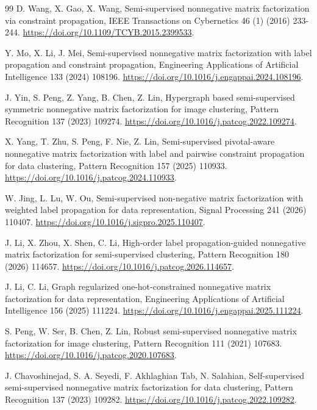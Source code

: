 \documentclass[preprint,12pt]{elsarticle}
\theoremstyle{remark}
\begin{document}
\begin{thebibliography}{99}
D. Wang, X. Gao, X. Wang, Semi-supervised nonnegative matrix factorization via constraint propagation,
IEEE Transactions on Cybernetics 46 (1) (2016) 233-244.
\url{https://doi.org/10.1109/TCYB.2015.2399533}.

Y. Mo, X. Li, J. Mei, Semi-supervised nonnegative matrix factorization with label propagation and constraint propagation,
Engineering Applications of Artificial Intelligence 133 (2024) 108196.
\url{https://doi.org/10.1016/j.engappai.2024.108196}.

J. Yin, S. Peng, Z. Yang, B. Chen, Z. Lin, Hypergraph based semi-supervised symmetric nonnegative matrix factorization for image clustering,
Pattern Recognition 137 (2023) 109274. \url{https://doi.org/10.1016/j.patcog.2022.109274}.

X. Yang, T. Zhu, S. Peng, F. Nie, Z. Lin, Semi-supervised pivotal-aware nonnegative matrix factorization with label and pairwise constraint propagation for data clustering,
Pattern Recognition 157 (2025) 110933. \url{https://doi.org/10.1016/j.patcog.2024.110933}.

W. Jing, L. Lu, W. Ou, Semi-supervised non-negative matrix factorization with weighted label propagation for data representation,
Signal Processing 241 (2026) 110407. \url{https://doi.org/10.1016/j.sigpro.2025.110407}.

J. Li, X. Zhou, X. Shen, C. Li, High-order label propagation-guided nonnegative matrix factorization for semi-supervised clustering,
Pattern Recognition 180 (2026) 114657. \url{https://doi.org/10.1016/j.patcog.2026.114657}.

J. Li, C. Li, Graph regularized one-hot-constrained nonnegative matrix factorization for data representation,
Engineering Applications of Artificial Intelligence 156 (2025) 111224.
\url{https://doi.org/10.1016/j.engappai.2025.111224}.

S. Peng, W. Ser, B. Chen, Z. Lin, Robust semi-supervised nonnegative matrix factorization for image clustering,
Pattern Recognition 111 (2021) 107683. \url{https://doi.org/10.1016/j.patcog.2020.107683}.

J. Chavoshinejad, S. A. Seyedi, F. Akhlaghian Tab, N. Salahian,
Self-supervised semi-supervised nonnegative matrix factorization for data clustering,
Pattern Recognition 137 (2023) 109282. \url{https://doi.org/10.1016/j.patcog.2022.109282}.


\end{thebibliography}
\end{document}
